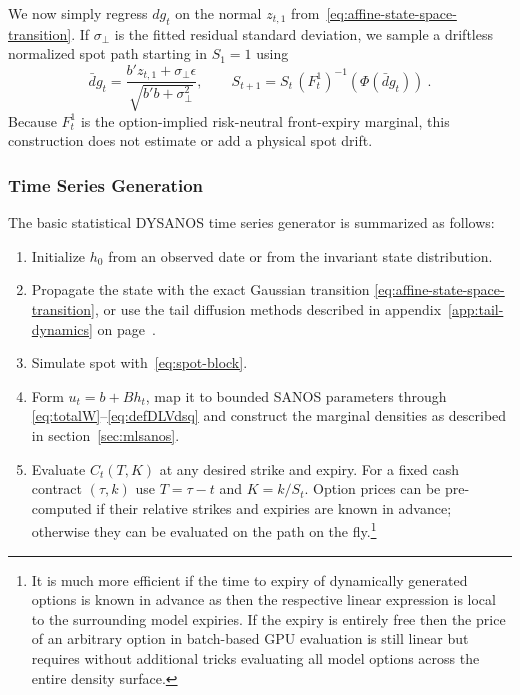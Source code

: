 \documentclass[11pt,a4paper]{article}
\begin{document}
We now simply regress $dg_t$ on the normal $z_{t,1}$ from~\eqref{eq:affine-state-space-transition}. If $\sigma_\perp$ is the fitted residual
standard deviation, we sample a driftless normalized spot path starting in $S_1=1$ using
\begin{equation}
  \bar dg_t=\frac{b'z_{t,1}+\sigma_\perp\epsilon}
          {\sqrt{b'b+\sigma_\perp^2}},
  \qquad
  S_{t+1}
    =S_t\, (F_t^1)^{-1}\!\left(\Phi(\bar dg_t)\right) \ .
  \label{eq:spot-block}
\end{equation}
Because $F_t^1$ is the option-implied risk-neutral front-expiry marginal, this
construction does not estimate or add a physical spot drift.

\subsubsection{Time Series Generation}
\label{sec:simulation}

The basic statistical DYSANOS time series generator is summarized as follows:
\begin{enumerate}
  \item Initialize $h_0$ from an observed
        date or from the invariant state distribution.
  \item Propagate the state with the exact Gaussian transition
        \eqref{eq:affine-state-space-transition}, or use the tail diffusion methods described in appendix~\ref{app:tail-dynamics} on
        page~\pageref{app:tail-dynamics}.
  \item Simulate spot with~\eqref{eq:spot-block}.
  \item Form $u_t=b+B h_t$, map it to bounded SANOS parameters through
        \eqref{eq:totalW}--\eqref{eq:defDLVdsq}  and construct the marginal densities
        as described in section~\ref{sec:mlsanos}.
  \item Evaluate $C_t(T,K)$ at any desired strike and expiry. For a fixed
        cash contract $(\tau,k)$ use $T=\tau-t$ and $K=k/S_t$. Option  prices can  be pre-computed
        if their relative strikes and expiries are known in advance; otherwise
        they can be evaluated on the path on the fly.\footnote{
          It is much more efficient if the time to expiry of dynamically generated options is known in advance
          as then the respective linear expression is local to the surrounding model expiries. If the
          expiry is entirely free then the price of an arbitrary option in batch-based GPU evaluation is still linear
          but requires without additional tricks evaluating all model options across the entire density surface.
        }
\end{enumerate}
\end{document}
